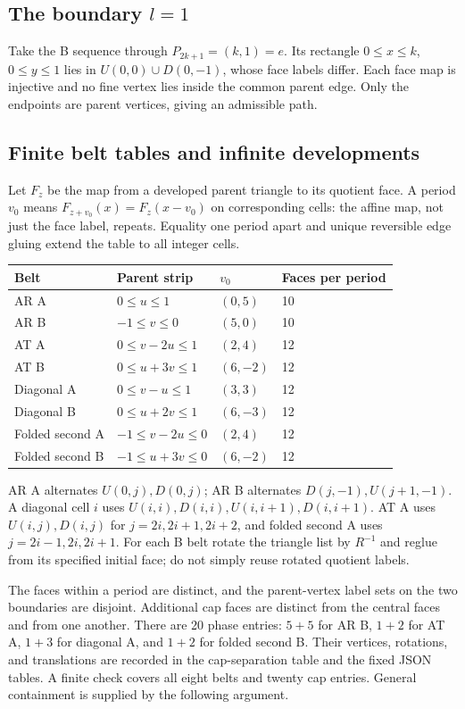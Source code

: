 \documentclass[11pt]{amsart}
\begin{document}
\subsection{The boundary \texorpdfstring{$l=1$}{l=1}}
Take the B sequence through $P_{2k+1}=(k,1)=e$. Its rectangle
$0\le x\le k$, $0\le y\le1$ lies in $U(0,0)\cup D(0,-1)$,
whose face labels differ. Each face map is injective and no fine vertex
lies inside the common parent edge. Only the endpoints are parent
vertices, giving an admissible path.

\subsection{Finite belt tables and infinite developments}
Let $F_z$ be the map from a developed parent triangle to its quotient
face. A period $v_0$ means $F_{z+v_0}(x)=F_z(x-v_0)$ on corresponding
cells: the affine map, not just the face label, repeats. Equality one
period apart and unique reversible edge gluing extend the table to all
integer cells.
\begin{center}\small
\begin{tabular}{llll}\toprule
Belt & Parent strip & $v_0$ & Faces per period\\\midrule
AR A & $0\le u\le1$ & $(0,5)$ &10\\
AR B & $-1\le v\le0$ & $(5,0)$ &10\\
AT A & $0\le v-2u\le1$ & $(2,4)$ &12\\
AT B & $0\le u+3v\le1$ & $(6,-2)$ &12\\
Diagonal A & $0\le v-u\le1$ & $(3,3)$ &12\\
Diagonal B & $0\le u+2v\le1$ & $(6,-3)$ &12\\
Folded second A & $-1\le v-2u\le0$ & $(2,4)$ &12\\
Folded second B & $-1\le u+3v\le0$ & $(6,-2)$ &12\\\bottomrule
\end{tabular}\end{center}
AR A alternates $U(0,j),D(0,j)$; AR B alternates
$D(j,-1),U(j+1,-1)$. A diagonal cell $i$ uses
$U(i,i),D(i,i),U(i,i+1),D(i,i+1)$. AT A uses $U(i,j),D(i,j)$ for
$j=2i,2i+1,2i+2$, and folded second A uses $j=2i-1,2i,2i+1$.
For each B belt rotate the triangle list by $R^{-1}$ and reglue from
its specified initial face; do not simply reuse rotated quotient labels.

The faces within a period are distinct, and the parent-vertex label
sets on the two boundaries are disjoint. Additional cap faces are
distinct from the central faces and from one another. There are 20
phase entries: $5+5$ for AR B, $1+2$ for AT A, $1+3$ for diagonal A,
and $1+2$ for folded second B. Their vertices, rotations, and translations
are recorded in the cap-separation table and the fixed JSON
tables. A finite check covers all eight belts and twenty cap entries.
General containment is supplied by the following argument.
\end{document}
